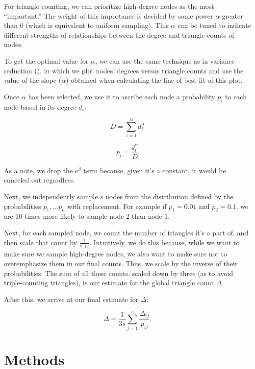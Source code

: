\documentclass[11pt, margin=1in]{article}
\begin{document}
For triangle counting, we can prioritize high-degree nodes as the most ``important.''
The weight of this importance is decided by some power $\alpha$ greater than 0 (which is equivalent to uniform sampling).
This $\alpha$ can be tuned to indicate different strengths of relationships between the degree and triangle counts of nodes. 

To get the optimal value for $\alpha$, we can use the same technique as in variance reduction (), in which we plot nodes' degrees versus triangle counts and use the value of the slope ($\alpha$) obtained when calculating the line of best fit of this plot.

Once $\alpha$ has been selected, we use it to ascribe each node a probability $p_i$ to each node based in its degree $d_i$:

\begin{equation}
D = \sum_{i = 1}^{n} d_i^\alpha
\label{eq:D}
\end{equation}

\begin{equation}
p_i = \frac{d_i^\alpha}{D}
\label{eq:pi}
\end{equation}

As a note, we drop the $e^{\beta}$ term because, given it's a constant, it would be canceled out regardless.

Next, we independently sample $s$ nodes from the distribution defined by the probabilities $p_1, \ldots p_n$ with replacement.
For example if $p_1 = 0.01$ and $p_2 = 0.1$, we are 10 times more likely to sample node 2 than node 1.

Next, for each sampled node, we count the number of triangles it's a part of, and then scale that count by $\frac{1}{s \cdot p_i}$.
Intuitively, we do this because, while we want to make sure we sample high-degree nodes, we also want to make sure not to overemphasize them in our final counts.
Thus, we scale by the inverse of their probabilities.
The sum of all these counts, scaled down by three (as to avoid triple-counting triangles), is our estimate for the global triangle count $\Delta$.

After this, we arrive at our final estimate for $\Delta$:

\[
\tilde{\Delta} = \frac{1}{3s} \sum_{j = 1}^{s} \frac{\Delta_{ij}}{p_{ij}}.
\]

\newpage

\section{Methods}
\end{document}
